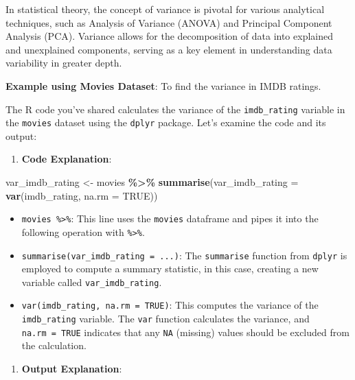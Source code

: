 \documentclass[
]{book}
\newenvironment{Shaded}{\begin{snugshade}}{\end{snugshade}}
\newcommand{\AttributeTok}[1]{\textcolor[rgb]{0.13,0.29,0.53}{#1}}
\newcommand{\ConstantTok}[1]{\textcolor[rgb]{0.56,0.35,0.01}{#1}}
\newcommand{\FunctionTok}[1]{\textcolor[rgb]{0.13,0.29,0.53}{\textbf{#1}}}
\newcommand{\NormalTok}[1]{#1}
\newcommand{\OtherTok}[1]{\textcolor[rgb]{0.56,0.35,0.01}{#1}}
\newcommand{\SpecialCharTok}[1]{\textcolor[rgb]{0.81,0.36,0.00}{\textbf{#1}}}
\providecommand{\tightlist}{%
  \setlength{\itemsep}{0pt}\setlength{\parskip}{0pt}}
\begin{document}
In statistical theory, the concept of variance is pivotal for various analytical techniques, such as Analysis of Variance (ANOVA) and Principal Component Analysis (PCA). Variance allows for the decomposition of data into explained and unexplained components, serving as a key element in understanding data variability in greater depth.

\textbf{Example using Movies Dataset}: To find the variance in IMDB ratings.

The R code you've shared calculates the variance of the \texttt{imdb\_rating} variable in the \texttt{movies} dataset using the \texttt{dplyr} package. Let's examine the code and its output:

\begin{enumerate}
\def\labelenumi{\arabic{enumi}.}
\tightlist
\item
  \textbf{Code Explanation}:
\end{enumerate}

\begin{Shaded}
\begin{Highlighting}[]
\NormalTok{var\_imdb\_rating }\OtherTok{\textless{}{-}}\NormalTok{ movies }\SpecialCharTok{\%\textgreater{}\%}
  \FunctionTok{summarise}\NormalTok{(}\AttributeTok{var\_imdb\_rating =} \FunctionTok{var}\NormalTok{(imdb\_rating, }\AttributeTok{na.rm =} \ConstantTok{TRUE}\NormalTok{))}
\end{Highlighting}
\end{Shaded}

\begin{itemize}
\tightlist
\item
  \texttt{movies\ \%\textgreater{}\%}: This line uses the \texttt{movies} dataframe and pipes it into the following operation with \texttt{\%\textgreater{}\%}.
\item
  \texttt{summarise(var\_imdb\_rating\ =\ ...)}: The \texttt{summarise} function from \texttt{dplyr} is employed to compute a summary statistic, in this case, creating a new variable called \texttt{var\_imdb\_rating}.
\item
  \texttt{var(imdb\_rating,\ na.rm\ =\ TRUE)}: This computes the variance of the \texttt{imdb\_rating} variable. The \texttt{var} function calculates the variance, and \texttt{na.rm\ =\ TRUE} indicates that any \texttt{NA} (missing) values should be excluded from the calculation.
\end{itemize}

\begin{enumerate}
\def\labelenumi{\arabic{enumi}.}
\setcounter{enumi}{1}
\tightlist
\item
  \textbf{Output Explanation}:
\end{enumerate}
\end{document}
